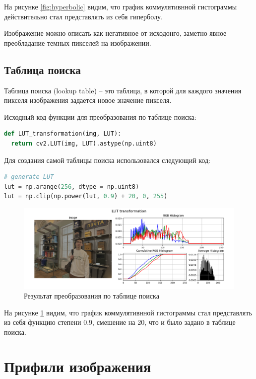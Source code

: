 \documentclass[a4paper, 12pt]{extarticle}
\begin{document}
На рисунке \ref{fig:hyperbolic} видим, что график коммулятивнной гистограммы действительно стал представлять из себя гиперболу. 

Изображение можно описать как негативное от исходонго, заметно явное преобладание темных пикселей на изображении.

\subsection{Таблица поиска}

Таблица поиска (lookup table) -- это таблица, в которой для каждого значения пикселя изображения задается новое значение пикселя.

Исходный код функции для преобразования по таблице поиска:

\begin{lstlisting}[language=Python]
def LUT_transformation(img, LUT):
  return cv2.LUT(img, LUT).astype(np.uint8)
\end{lstlisting}

Для создания самой таблицы поиска использовался следующий код:  

\begin{lstlisting}[language=Python]
# generate LUT 
lut = np.arange(256, dtype = np.uint8)
lut = np.clip(np.power(lut, 0.9) + 20, 0, 255)
\end{lstlisting}

\begin{figure}[h]
    \centering
    \includegraphics[width=\textwidth]{../results/LUT transformation.png}
    \caption{Результат преобразования по таблице поиска}
    \label{fig:lut}
\end{figure}

На рисунке \ref{fig:lut} видим, что график коммулятивнной гистограммы стал представлять из себя функцию степени 0.9, смешение на 20, что и было задано в таблице поиска.  

\newpage
\section{Прифили изображения}
\end{document}
